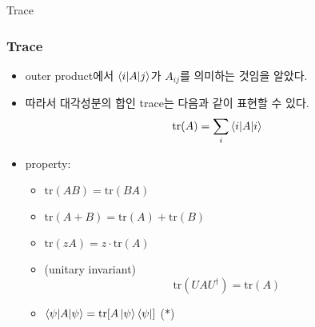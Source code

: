 \documentclass[9pt]{beamer}
\begin{document}
    \begin{section}{Trace}
        \begin{frame}
            \frametitle{Trace}
                \begin{itemize}
                    \item outer product에서 $\braket{i|A|j}$가 $A_{ij}$를 의미하는 것임을 알았다.
                    \item 따라서 대각성분의 합인 trace는 다음과 같이 표현할 수 있다.
                    $$ \operatorname{tr}(A) = \sum_i \braket{i|A|i}$$
                    \item property:
                    \begin{itemize}
                        \item $\text{tr}(AB) = \text{tr}(BA)$
                        \item $\text{tr}(A+B) = \text{tr}(A) + \text{tr}(B)$
                        \item $\text{tr}(zA) = z \cdot \text{tr}(A)$
                        \item (unitary invariant)
                        $$\text{tr}(UAU^\dagger) = \text{tr}(A)$$
                        \item $\braket{\psi | A |\psi} = \text{tr}[A \ket \psi \bra \psi]$ ($\ast$)
                    \end{itemize}
                \end{itemize}
            
        
        \end{frame}
    \end{section}
\end{document}
